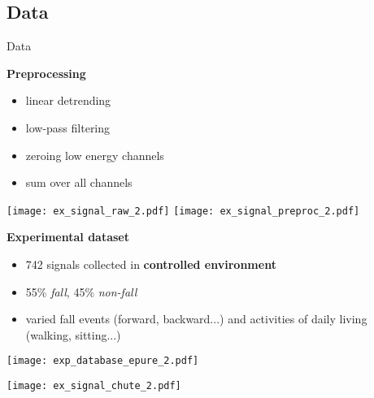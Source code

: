 \subsection{Data}

\begin{frame}{Data}
\begin{minipage}[t]{0.49\linewidth}
    \vspace{0pt}
        \textbf{Preprocessing}
        \begin{itemize}
            \item linear detrending
            \item low-pass filtering
            \item zeroing low energy channels
            \item sum over all channels
        \end{itemize}
    \medskip
    \begin{overprint}
            \texttt{[image: ex\_signal\_raw\_2.pdf]}
            \texttt{[image: ex\_signal\_preproc\_2.pdf]}
    \end{overprint}
\end{minipage}\hfill
\begin{minipage}[t]{0.49\linewidth}
\vspace{0pt}
    \pause \pause
    \textbf{Experimental dataset}
    \begin{itemize}
        \item 742 signals collected in \textbf{controlled environment}
        \item 55\% \emph{fall}, 45\% \emph{non-fall}
        \item varied fall events (forward, backward...) and activities of daily living (walking, sitting...)
    \end{itemize}
    \smallskip
    \centering
    \texttt{[image: exp\_database\_epure\_2.pdf]}\\

\end{minipage}
    \pause
    \centering
    \texttt{[image: ex\_signal\_chute\_2.pdf]}

\end{frame}

